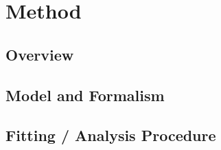 \section{Method}
\label{sec:method}

\subsection{Overview}
\label{subsec:overview}


\subsection{Model and Formalism}
\label{subsec:formalism}


\subsection{Fitting / Analysis Procedure}
\label{subsec:procedure}

